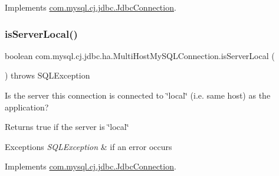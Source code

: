 Implements \mbox{\hyperlink{interfacecom_1_1mysql_1_1cj_1_1jdbc_1_1_jdbc_connection_a90906591d933e0d9f10dbb9db6b5a83a}{com.\+mysql.\+cj.\+jdbc.\+Jdbc\+Connection}}.

\mbox{\label{classcom_1_1mysql_1_1cj_1_1jdbc_1_1ha_1_1_multi_host_my_s_q_l_connection_ae6f52873381a19395473dd957c756ee7}} 
\subsubsection{\texorpdfstring{is\+Server\+Local()}{isServerLocal()}}
{\footnotesize\ttfamily boolean com.\+mysql.\+cj.\+jdbc.\+ha.\+Multi\+Host\+My\+S\+Q\+L\+Connection.\+is\+Server\+Local (\begin{DoxyParamCaption}{ }\end{DoxyParamCaption}) throws S\+Q\+L\+Exception}

Is the server this connection is connected to \char`\"{}local\char`\"{} (i.\+e. same host) as the application?

\begin{DoxyReturn}{Returns}
true if the server is \char`\"{}local\char`\"{} 
\end{DoxyReturn}

\begin{DoxyExceptions}{Exceptions}
{\em S\+Q\+L\+Exception} & if an error occurs \\
\hline
\end{DoxyExceptions}


Implements \mbox{\hyperlink{interfacecom_1_1mysql_1_1cj_1_1jdbc_1_1_jdbc_connection_a4418f89cdbd768f892b6ef7823107921}{com.\+mysql.\+cj.\+jdbc.\+Jdbc\+Connection}}.

\mbox{\label{classcom_1_1mysql_1_1cj_1_1jdbc_1_1ha_1_1_multi_host_my_s_q_l_connection_a92eee8d15646301da3c4c64e243b6596}} 
